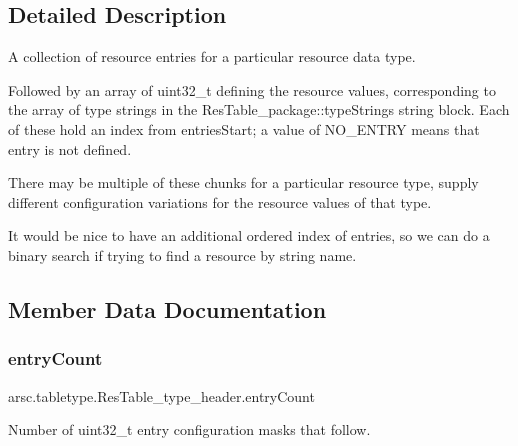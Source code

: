 \subsection{Detailed Description}
A collection of resource entries for a particular resource data type. 

Followed by an array of uint32\+\_\+t defining the resource values, corresponding to the array of type strings in the Res\+Table\+\_\+package\+::type\+Strings string block. Each of these hold an index from entries\+Start; a value of N\+O\+\_\+\+E\+N\+T\+RY means that entry is not defined.

There may be multiple of these chunks for a particular resource type, supply different configuration variations for the resource values of that type.

It would be nice to have an additional ordered index of entries, so we can do a binary search if trying to find a resource by string name. 

\subsection{Member Data Documentation}
\mbox{\label{classarsc_1_1tabletype_1_1ResTable__type__header_aaf33c49ce80c953b5040683ba2f887ab}} 
\subsubsection{\texorpdfstring{entry\+Count}{entryCount}}
{\footnotesize\ttfamily arsc.\+tabletype.\+Res\+Table\+\_\+type\+\_\+header.\+entry\+Count}



Number of uint32\+\_\+t entry configuration masks that follow. 

\mbox{\label{classarsc_1_1tabletype_1_1ResTable__type__header_abef8272ec94fa03d9c4e172581d65e40}} 
